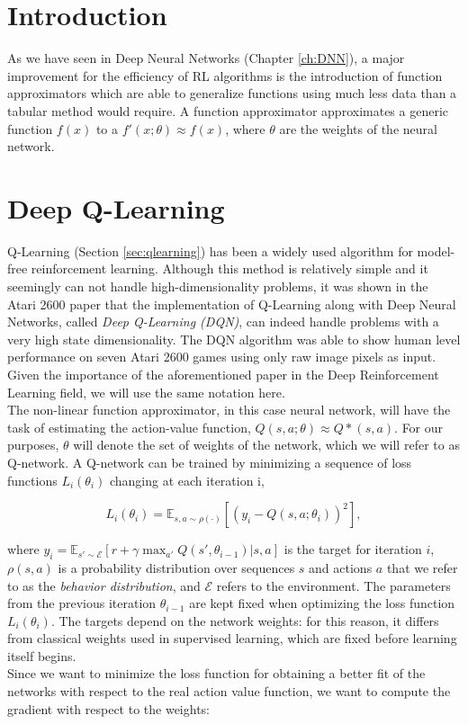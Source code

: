 \label{ch:deeprl}

\section{Introduction}
As we have seen in Deep Neural Networks (Chapter \ref{ch:DNN}), a major improvement for the efficiency of RL algorithms is the introduction of function approximators which are able to generalize functions using much less data than a tabular method would require. A function approximator approximates a generic function $f(x)$ to a $f'(x;\theta) \approx f(x)$, where $\theta$ are the weights of the neural network.


\section{Deep Q-Learning}

\label{sec:DQN}
Q-Learning (Section \ref{sec:qlearning}) has been a widely used algorithm for model-free reinforcement learning. Although this method is relatively simple and it seemingly can not handle high-dimensionality problems, it was shown in the Atari 2600 paper\cite{mnih2013playing} that the implementation of Q-Learning along with Deep Neural Networks, called \textit{Deep Q-Learning (DQN)}, can indeed handle problems with a very high state dimensionality. The DQN algorithm was able to show human level performance on seven Atari 2600 games using only raw image pixels as input. Given the importance of the aforementioned paper in the Deep Reinforcement Learning field, we will use the same notation here.
\\
\indent The non-linear function approximator, in this case neural network, will have the task of estimating the action-value function, $Q(s,a; \theta) \approx Q*(s,a)$. For our purposes, $\theta$ will denote the set of weights of the network, which we will refer to as Q-network. A Q-network can be trained by minimizing a sequence of loss functions $L_i(\theta_i)$ changing at each iteration i,

\begin{equation}
	L_i(\theta_i) = \mathbb{E}_{s,a \sim \rho(\cdot)}[\left(y_i - Q(s,a;\theta_i)\right)^2],
	\label{eq:lossfunction}
\end{equation}

where $y_i = \mathbb{E}_{s' \sim \mathcal{E}} [r + \gamma \max_{a'}Q(s', \theta_{i-1}) | s,a]$ is the target for iteration $i$, $\rho(s,a)$ is a probability distribution over sequences $s$ and actions $a$ that we refer to as the \textit{behavior distribution}, and $\mathcal{E}$ refers to the environment. The parameters from the previous iteration $\theta_{i-1}$ are kept fixed when optimizing the loss function $L_i(\theta_i)$. The targets depend on the network weights: for this reason, it differs from classical weights used in supervised learning, which are fixed before learning itself begins. 
\\
\indent Since we want to minimize the loss function for obtaining a better fit of the networks with respect to the real action value function, we want to compute the gradient with respect to the weights:

